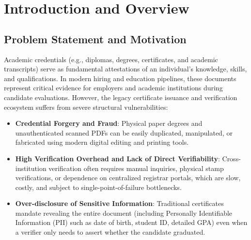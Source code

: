 
\chapter{Introduction and Overview}

\section{Problem Statement and Motivation}

Academic credentials (e.g., diplomas, degrees, certificates, and academic transcripts) serve as fundamental attestations of an individual's knowledge, skills, and qualifications. In modern hiring and education pipelines, these documents represent critical evidence for employers and academic institutions during candidate evaluations. However, the legacy certificate issuance and verification ecosystem suffers from severe structural vulnerabilities:

\begin{itemize}
    \item \textbf{Credential Forgery and Fraud}: Physical paper degrees and unauthenticated scanned PDFs can be easily duplicated, manipulated, or fabricated using modern digital editing and printing tools.
    \item \textbf{High Verification Overhead and Lack of Direct Verifiability}: Cross-institution verification often requires manual inquiries, physical stamp verifications, or dependence on centralized registrar portals, which are slow, costly, and subject to single-point-of-failure bottlenecks.
    \item \textbf{Over-disclosure of Sensitive Information}: Traditional certificates mandate revealing the entire document (including Personally Identifiable Information (PII) such as date of birth, student ID, detailed GPA) even when a verifier only needs to assert whether the candidate graduated.
\end{itemize}

